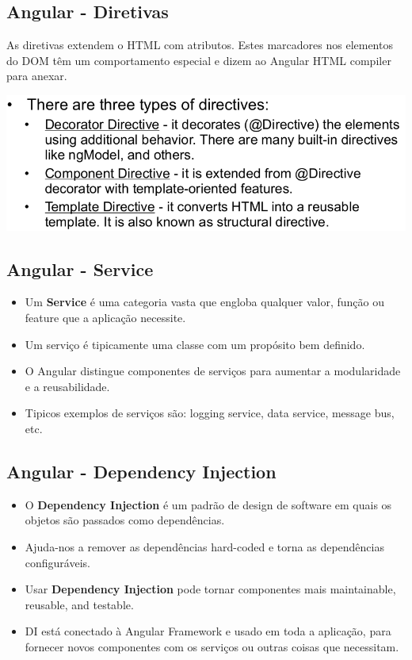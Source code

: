 \documentclass{article}
\begin{document}
\subsection{Angular - Diretivas}

As diretivas extendem o HTML com atributos. Estes marcadores nos elementos
do DOM têm um comportamento especial e dizem ao Angular HTML compiler para
anexar.

\begin{center}
  \includegraphics[scale=0.3]{5}
\end{center}

\subsection{Angular - Service}

\begin{itemize}
  \item Um \textbf{Service} é uma categoria vasta que engloba qualquer valor,
  função ou feature que a aplicação necessite.
  \item Um serviço é tipicamente uma classe com um propósito bem definido.
  \item O Angular distingue componentes de serviços para aumentar a modularidade e a reusabilidade.
  \item Tipicos exemplos de serviços são: logging service, data service, message bus, etc.
\end{itemize}

\subsection{Angular - Dependency Injection}

\begin{itemize}
  \item O \textbf{Dependency Injection} é um padrão de design de software
  em quais os objetos são passados como dependências.
  \item Ajuda-nos a remover as dependências hard-coded e torna as dependências configuráveis.
  \item Usar \textbf{Dependency Injection} pode tornar componentes mais maintainable, reusable, and
  testable.
  \item DI está conectado à Angular Framework e usado em toda a aplicação,
  para fornecer novos componentes com os serviços ou outras coisas que necessitam.
\end{itemize}
\end{document}
